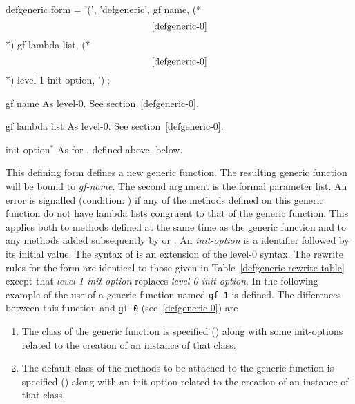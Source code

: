 \begin{optDefinition}
\label{defgeneric-1}
%
\Syntax
\savesyntax{}\vbox{\small\syntax
defgeneric form
   = '(', 'defgeneric',
     gf name, (* \[\ref{defgeneric-0}\] *)
     gf lambda list, (* \[\ref{defgeneric-0}\] *)
     {level 1 init option}, ')';
\endsyntax}
%
\begin{arguments}
    \item[gf name] As level-0.  See section~\ref{defgeneric-0}.

    \item[gf lambda list] As level-0.  See section~\ref{defgeneric-0}.

    \item[init option\/$^*$] As for , defined above.
    below.
\end{arguments}
%
\remarks%
This defining form defines a new generic function.  The resulting
generic function will be bound to {\em gf-name}.  The second argument is the
formal parameter list.  An error is signalled (condition:
)
if any of the methods defined on this generic function do not have lambda lists
congruent to that of the generic function.  This applies both to methods defined
at the same time as the generic function and to any methods added subsequently
by  or .  An {\em init-option} is a
identifier followed by its initial value.  The syntax of 
is an extension of the level-0 syntax.  The rewrite rules for the
 form are identical to those given in
Table~\ref{defgeneric-rewrite-table} except that {\em level 1 init option}
replaces {\em level 0 init option}.
%
\examples
In the following example of the use of  a generic
function named {\tt gf-1} is defined.  The differences between this
function and {\tt gf-0} (see~\ref{defgeneric-0}) are
\begin{enumerate}
    \item The class of the generic function is specified
    () along with some init-options related to the
    creation of an instance of that class.

    \item The default class of the methods to be attached to the generic
    function is specified () along with an
    init-option related to the creation of an instance of that class.


\end{enumerate}
\end{optDefinition}
